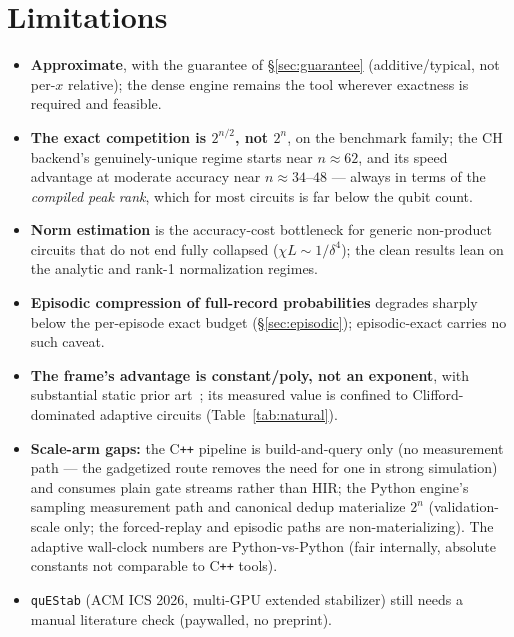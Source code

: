 \documentclass[11pt]{article}
\begin{document}
\section{Limitations}
\begin{itemize}
\item \textbf{Approximate}, with the guarantee of \S\ref{sec:guarantee}
(additive/typical, not per-$x$ relative); the dense engine remains the tool
wherever exactness is required and feasible.
\item \textbf{The exact competition is $2^{n/2}$, not $2^n$}, on the
benchmark family; the CH backend's genuinely-unique regime starts near
$n\!\approx\!62$, and its speed advantage at moderate accuracy near
$n\!\approx\!34$--$48$ --- always in terms of the \emph{compiled peak rank},
which for most circuits is far below the qubit count.
\item \textbf{Norm estimation} is the accuracy-cost bottleneck for generic
non-product circuits that do not end fully collapsed
($\chi L\sim1/\delta^4$); the clean results lean on the analytic and rank-1
normalization regimes.
\item \textbf{Episodic compression of full-record probabilities} degrades
sharply below the per-episode exact budget (\S\ref{sec:episodic});
episodic-exact carries no such caveat.
\item \textbf{The frame's advantage is constant/poly, not an exponent}, with
substantial static prior
art~\cite{bravyi2016,qassim2019,garcia2015,pashayan2022}; its measured value
is confined to Clifford-dominated adaptive circuits
(Table~\ref{tab:natural}).
\item \textbf{Scale-arm gaps:} the C\texttt{++} pipeline is build-and-query
only (no measurement path --- the gadgetized route removes the need for one
in strong simulation) and consumes plain gate streams rather than HIR; the
Python engine's sampling measurement path and canonical dedup materialize
$2^n$ (validation-scale only; the forced-replay and episodic paths are
non-materializing). The adaptive wall-clock numbers are Python-vs-Python
(fair internally, absolute constants not comparable to C\texttt{++} tools).
\item \texttt{quEStab} (ACM ICS 2026, multi-GPU extended stabilizer) still
needs a manual literature check (paywalled, no preprint).
\end{itemize}
\end{document}

